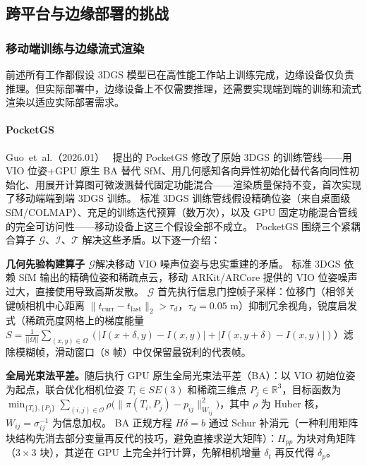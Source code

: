 \subsection{跨平台与边缘部署的挑战}

\subsubsection{移动端训练与边缘流式渲染}

前述所有工作都假设 3DGS 模型已在高性能工作站上训练完成，边缘设备仅负责推理。但实际部署中，边缘设备上不仅需要推理，还需要实现端到端的训练和流式渲染以适应实际部署需求。

\paragraph{PocketGS}
Guo~et~al.（2026.01）~\cite{2601_17354} 提出的 PocketGS 修改了原始 3DGS 的训练管线——用 VIO 位姿+GPU 原生 BA 替代 SfM、用几何感知各向异性初始化替代各向同性初始化、用展开计算图可微泼溅替代固定功能混合——渲染质量保持不变，首次实现了移动端端到端 3DGS 训练。
标准 3DGS 训练管线假设精确位姿（来自桌面级 SfM/COLMAP）、充足的训练迭代预算（数万次），以及 GPU 固定功能混合管线的完全可访问性——移动设备上这三个假设全部不成立。
PocketGS 围绕三个紧耦合算子 $\mathcal{G}$、$\mathcal{I}$、$\mathcal{T}$ 解决这些矛盾。以下逐一介绍：

\textbf{几何先验构建算子 $\mathcal{G}$}解决移动 VIO 噪声位姿与忠实重建的矛盾。
标准 3DGS 依赖 SfM 输出的精确位姿和稀疏点云，移动 ARKit/ARCore 提供的 VIO 位姿噪声过大，直接使用导致高斯发散。
$\mathcal{G}$ 首先执行信息门控帧子采样：位移门（相邻关键帧相机中心距离 $\|t_\text{curr} - t_\text{last}\|_2 > \tau_d$，$\tau_d = 0.05$ m）抑制冗余视角，锐度启发式（稀疏亮度网格上的梯度能量 $S = \frac{1}{||\Omega||}\sum_{(x,y) \in \Omega}(|I(x\!+\!\delta, y) - I(x,y)| + |I(x, y\!+\!\delta) - I(x,y)|)$）滤除模糊帧，滑动窗口（8 帧）中仅保留最锐利的代表帧。

\textbf{全局光束法平差。}随后执行 GPU 原生全局光束法平差（BA）：以 VIO 初始位姿为起点，联合优化相机位姿 $T_i \in SE(3)$ 和稀疏三维点 $P_j \in \mathbb{R}^3$，目标函数为 $\min_{\{T_i\},\{P_j\}} \sum_{(i,j) \in \mathcal{O}} \rho\big(\|\pi(T_i, P_j) - p_{ij}\|^2_{W_{ij}}\big)$，其中 $\rho$ 为 Huber 核，$W_{ij} = \sigma_{ij}^{-1}$ 为信息加权。
BA 正规方程 $H\delta = b$ 通过 Schur 补消元（一种利用矩阵块结构先消去部分变量再反代的技巧，避免直接求逆大矩阵）：$H_{pp}$ 为块对角矩阵（$3 \times 3$ 块），其逆在 GPU 上完全并行计算，先解相机增量 $\delta_t$ 再反代得 $\delta_p$。

